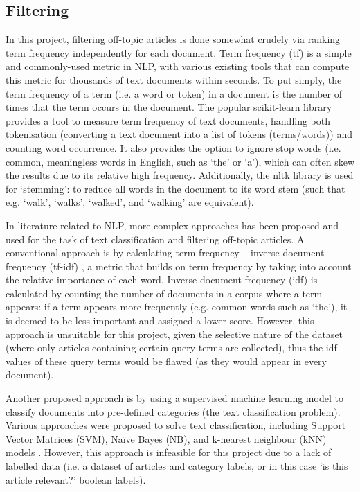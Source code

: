 \documentclass{report}
\begin{document}
\subsection{Filtering} \label{tc-filtering}
In this project, filtering off-topic articles is done somewhat crudely via ranking term frequency independently for each document.
Term frequency (tf) is a simple and commonly-used metric in NLP, with various existing tools that can compute this metric for thousands of text documents within seconds.
To put simply, the term frequency of a term (i.e. a word or token) in a document is the number of times that the term occurs in the document.
The popular scikit-learn library \cite{Scikit-learn} provides a tool to measure term frequency of text documents, handling both tokenisation (converting a text document into a list of tokens (terms/words)) and counting word occurrence.
It also provides the option to ignore stop words (i.e. common, meaningless words in English, such as `the' or `a'), which can often skew the results due to its relative high frequency.
Additionally, the nltk library \cite{Nltk} is used for `stemming': to reduce all words in the document to its word stem (such that e.g. `walk', `walks', `walked', and `walking' are equivalent).

In literature related to NLP, more complex approaches has been proposed and used for the task of text classification and filtering off-topic articles.
A conventional approach is by calculating term frequency -- inverse document frequency (tf-idf) \cite{robertson2004understanding, sparck1972statistical}, a metric that builds on term frequency by taking into account the relative importance of each word.
Inverse document frequency (idf) is calculated by counting the number of documents in a corpus where a term appears: if a term appears more frequently (e.g. common words such as `the'), it is deemed to be less important and assigned a lower score.
However, this approach is unsuitable for this project, given the selective nature of the dataset (where only articles containing certain query terms are collected), thus the idf values of these query terms would be flawed (as they would appear in every document).

Another proposed approach is by using a supervised machine learning model to classify documents into pre-defined categories (the text classification problem).
Various approaches were proposed to solve text classification, including Support Vector Matrices (SVM), Na\"{i}ve Bayes (NB), and k-nearest neighbour (kNN) models \cite{khan2010review}.
However, this approach is infeasible for this project due to a lack of labelled data (i.e. a dataset of articles and category labels, or in this case `is this article relevant?' boolean labels).
\end{document}
